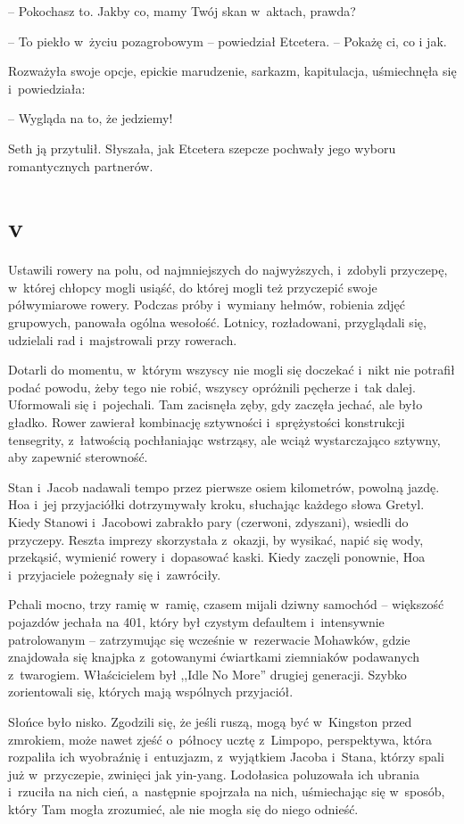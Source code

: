 \documentclass[oneside,polish,11pt,sfheadings]{mwbk}
\begin{document}
-- Pokochasz to. Jakby co, mamy Twój skan w~aktach, prawda?

-- To piekło w~życiu pozagrobowym -- powiedział Etcetera. -- Pokażę ci, co
i jak.

Rozważyła swoje opcje, epickie marudzenie, sarkazm, kapitulacja,
uśmiechnęła się i~powiedziała: 

-- Wygląda na to, że jedziemy!

Seth ją
przytulił. Słyszała, jak Etcetera szepcze pochwały jego wyboru
romantycznych partnerów.

\chapter*{v}
Ustawili rowery na polu, od najmniejszych do najwyższych, i~zdobyli
przyczepę, w~której chłopcy mogli usiąść, do której mogli też przyczepić
swoje półwymiarowe rowery. Podczas próby i~wymiany hełmów, robienia
zdjęć grupowych, panowała ogólna wesołość. Lotnicy, rozładowani,
przyglądali się, udzielali rad i~majstrowali przy rowerach.

Dotarli do momentu, w~którym wszyscy nie mogli się doczekać i~nikt nie
potrafił podać powodu, żeby tego nie robić, wszyscy opróżnili pęcherze i~tak dalej. Uformowali się i~pojechali. Tam zacisnęła zęby, gdy zaczęła
jechać, ale było gładko. Rower zawierał kombinację sztywności i~sprężystości konstrukcji tensegrity, z~łatwością pochłaniając wstrząsy,
ale wciąż wystarczająco sztywny, aby zapewnić sterowność.

Stan i~Jacob nadawali tempo przez pierwsze osiem kilometrów, powolną
jazdę. Hoa i~jej przyjaciółki dotrzymywały kroku, słuchając każdego
słowa Gretyl. Kiedy Stanowi i~Jacobowi zabrakło pary (czerwoni,
zdyszani), wsiedli do przyczepy. Reszta imprezy skorzystała z~okazji, by
wysikać, napić się wody, przekąsić, wymienić rowery i~dopasować kaski.
Kiedy zaczęli ponownie, Hoa i~przyjaciele pożegnały się i~zawróciły.

Pchali mocno, trzy ramię w~ramię, czasem mijali dziwny samochód -- większość pojazdów jechała na 401, który był czystym defaultem i~intensywnie patrolowanym -- zatrzymując się wcześnie w~rezerwacie
Mohawków, gdzie znajdowała się knajpka z~gotowanymi ćwiartkami
ziemniaków podawanych z~twarogiem. Właścicielem był ,,Idle No More''
drugiej generacji. Szybko zorientowali się, których mają wspólnych
przyjaciół.

Słońce było nisko. Zgodzili się, że jeśli ruszą, mogą być w~Kingston
przed zmrokiem, może nawet zjeść o~północy ucztę z~Limpopo, perspektywa,
która rozpaliła ich wyobraźnię i~entuzjazm, z~wyjątkiem Jacoba i~Stana,
którzy spali już w~przyczepie, zwinięci jak yin-yang. Lodołasica
poluzowała ich ubrania i~rzuciła na nich cień, a~następnie spojrzała na
nich, uśmiechając się w~sposób, który Tam mogła zrozumieć, ale nie mogła
się do niego odnieść.
\end{document}
